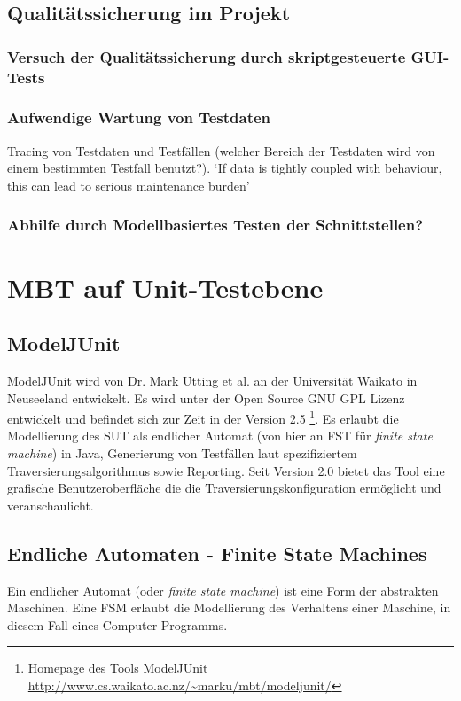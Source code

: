 \subsection{Qualitätssicherung im Projekt}
\subsubsection{Versuch der Qualitätssicherung durch skriptgesteuerte GUI-Tests}
\subsubsection{Aufwendige Wartung von Testdaten}
Tracing von Testdaten und Testfällen (welcher Bereich der Testdaten wird von einem bestimmten Testfall benutzt?). `If data is tightly coupled with behaviour, this can lead to serious maintenance burden' \cite{baker_model-driven_2005} 
\subsubsection{Abhilfe durch Modellbasiertes Testen der Schnittstellen?}


\section{MBT auf Unit-Testebene}
\subsection{ModelJUnit}
ModelJUnit wird von Dr. Mark Utting et al. an der Universität Waikato in Neuseeland entwickelt. Es wird unter der Open Source GNU GPL Lizenz entwickelt und befindet sich zur Zeit in der Version 2.5 \footnote{Homepage des Tools ModelJUnit \url{http://www.cs.waikato.ac.nz/~marku/mbt/modeljunit/}}. Es erlaubt die Modellierung des SUT als endlicher Automat (von hier an FST für \textit{finite state machine}) in Java, Generierung von Testfällen laut spezifiziertem Traversierungsalgorithmus sowie Reporting. Seit Version 2.0 bietet das Tool eine grafische Benutzeroberfläche die die Traversierungskonfiguration ermöglicht und veranschaulicht.\\

\subsection{Endliche Automaten - Finite State Machines}
Ein endlicher Automat (oder \textit{finite state machine}) ist eine Form der abstrakten Maschinen. Eine FSM erlaubt die Modellierung des Verhaltens einer Maschine, in diesem Fall eines Computer-Programms.\\


